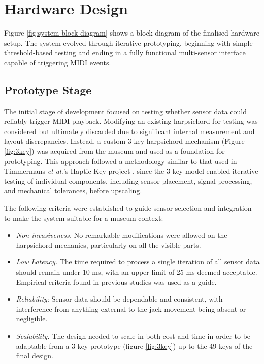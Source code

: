 \section{Hardware Design}\label{hardware-design}

Figure \ref{fig:system-block-diagram} shows a block diagram of the finalised hardware setup. The system evolved through iterative prototyping, beginning with simple threshold-based testing and ending in a fully functional multi-sensor interface capable of triggering MIDI events. 

\subsection{Prototype Stage}

The initial stage of development focused on testing whether sensor data could reliably trigger MIDI playback. Modifying an existing harpsichord for testing was considered but ultimately discarded due to significant internal measurement and layout discrepancies. Instead, a custom 3-key harpsichord mechanism (Figure \ref{fig:3key}) was acquired from the museum and used as a foundation for prototyping. This approach followed a methodology similar to that used in Timmermans \emph{et al.}'s Haptic Key project \cite{Timmermans2020}, since the 3-key model enabled iterative testing of individual components, including sensor placement, signal processing, and mechanical tolerances, before upscaling. 

The following criteria were established to guide sensor selection and integration to make the system suitable for a museum context:

\begin{itemize}
    \item \emph{Non-invasiveness.} No remarkable modifications were allowed on the harpsichord mechanics, particularly on all the visible parts.
    \item \emph{Low Latency.} The time required to process a single iteration of all sensor data should remain under 10 ms, with an upper limit of 25 ms deemed acceptable. Empirical criteria found in previous studies \cite{Jack2016} was used as a guide.
    \item \emph{Reliability:} Sensor data should be dependable and consistent, with interference from anything external to the jack movement being absent or negligible.
    \item \emph{Scalability.} The design needed to scale in both cost and time in order to be adaptable from a 3-key prototype (figure \ref{fig:3key}) up to the 49 keys of the final design.
\end{itemize}

